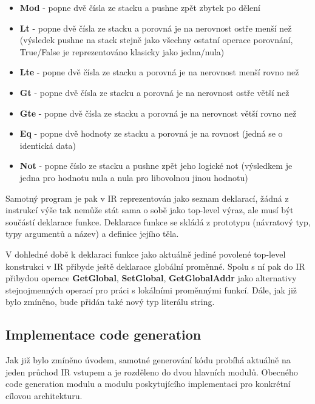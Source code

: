 \documentclass{article}
\begin{document}
\begin{itemize}
    \item \textbf{Mod} - popne dvě čísla ze stacku a pushne zpět zbytek po dělení
    \item \textbf{Lt} - popne dvě čísla ze stacku a porovná je na nerovnost ostře menší než (výsledek pushne na stack stejně jako všechny ostatní operace porovnání, True/False je reprezentováno klasicky jako jedna/nula)
    \item \textbf{Lte} - popne dvě čísla ze stacku a porovná je na nerovnost menší rovno než
    \item \textbf{Gt} - popne dvě čísla ze stacku a porovná je na nerovnost ostře větší než
    \item \textbf{Gte} - popne dvě čísla ze stacku a porovná je na nerovnost větší rovno než
    \item \textbf{Eq} - popne dvě hodnoty ze stacku a porovná je na rovnost (jedná se o identická data)
    \item \textbf{Not} - popne číslo ze stacku a pushne zpět jeho logické not (výsledkem je jedna pro hodnotu nula a nula pro libovolnou jinou hodnotu)
\end{itemize}

Samotný program je pak v IR reprezentován jako seznam deklarací, žádná z instrukcí výše tak nemůže stát sama o sobě jako top-level výraz, ale musí být součástí deklarace funkce. Deklarace funkce se skládá z prototypu (návratový typ, typy argumentů a název) a definice jejího těla.

V dohledné době k deklaraci funkce jako aktuálně jediné povolené top-level konstrukci v IR přibyde ještě deklarace globální proměnné. Spolu s ní pak do IR přibydou operace \textbf{GetGlobal}, \textbf{SetGlobal}, \textbf{GetGlobalAddr} jako alternativy stejnojmenných operací pro práci s lokálními proměnnými funkcí. Dále, jak již bylo zmíněno, bude přidán také nový typ literálu string.

\subsection{Implementace code generation}

Jak již bylo zmíněno úvodem, samotné generování kódu probíhá aktuálně na jeden průchod IR vstupem a je rozděleno do dvou hlavních modulů. Obecného code generation modulu a modulu poskytujícího implementaci pro konkrétní cílovou architekturu.
\end{document}
